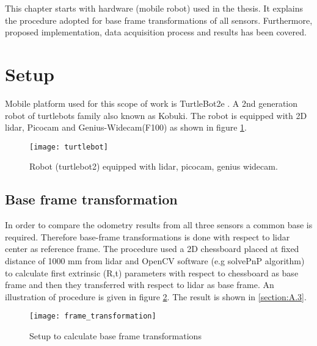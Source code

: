 This chapter starts with hardware (mobile robot) used in the thesis. It explains the procedure adopted for base frame transformations of all sensors. Furthermore, proposed implementation, data acquisition process and results has been covered.

\section{Setup}
Mobile platform used for this scope of work is TurtleBot2e \cite{turtlebot2}. A 2nd generation robot of turtlebots family also known as Kobuki. The robot is equipped with 2D \acrshort{lidar}, Picocam and Genius-Widecam(F100) as shown in figure \ref{fig:turtlebot}.
\begin{figure}[h!]
	\centering
	\texttt{[image: turtlebot]}
	\caption{Robot (turtlebot2) equipped with \acrshort{lidar}, picocam, genius widecam.}
	\label{fig:turtlebot}
\end{figure}
\subsection{Base frame transformation}
In order to compare the odometry results from all three sensors a common base is required. Therefore base-frame transformations is done with respect to \acrshort{lidar} center as reference frame. The procedure used a 2D chessboard placed at fixed distance of 1000 mm from \acrshort{lidar} and OpenCV software (e.g solvePnP algorithm) to calculate first extrinsic (R,t) parameters with respect to chessboard as base frame and then they transferred with respect to \acrshort{lidar} as base frame. An illustration of procedure is given in figure \ref{fig:transformation}. The result is shown in \ref{section:A.3}.
\begin{figure}[h!]
	\centering
	\texttt{[image: frame\_transformation]}
	\caption{Setup to calculate base frame transformations}
	\label{fig:transformation}
\end{figure} 

